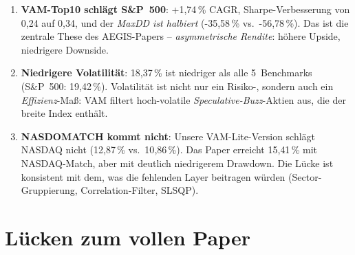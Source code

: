 \begin{enumerate}
  \item \textbf{VAM-Top10 schlägt S\&P~500}: +1{,}74\,\% CAGR,
        Sharpe-Verbesserung von 0{,}24 auf 0{,}34, und der
        \emph{MaxDD ist halbiert} (-35{,}58\,\% vs.\ -56{,}78\,\%).
        Das ist die zentrale These des AEGIS-Papers --
        \emph{asymmetrische Rendite}: höhere Upside, niedrigere
        Downside.
  \item \textbf{Niedrigere Volatilität}: 18{,}37\,\% ist niedriger als
        alle 5~Benchmarks (S\&P~500: 19{,}42\,\%). Volatilität ist
        nicht nur ein Risiko-, sondern auch ein
        \emph{Effizienz}-Maß: VAM filtert hoch-volatile
        \emph{Speculative-Buzz}-Aktien aus, die der breite Index
        enthält.
  \item \textbf{NASDOMATCH kommt nicht}: Unsere VAM-Lite-Version
        schlägt NASDAQ nicht (12{,}87\,\% vs.\ 10{,}86\,\%). Das
        Paper erreicht 15{,}41\,\% mit NASDAQ-Match, aber mit
        deutlich niedrigerem Drawdown. Die Lücke ist konsistent
        mit dem, was die fehlenden Layer beitragen würden
        (Sector-Gruppierung, Correlation-Filter, SLSQP).
\end{enumerate}

\section{Lücken zum vollen Paper}

